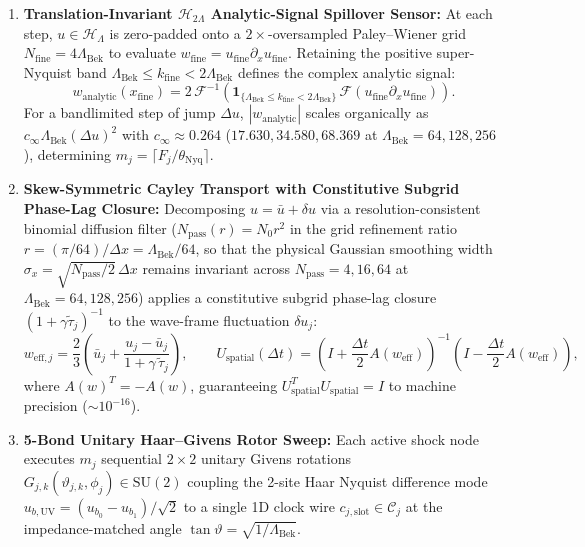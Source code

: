 \documentclass[11pt,a4paper]{article}
\theoremstyle{definition}
\begin{document}
\begin{enumerate}
\item \textbf{Translation-Invariant $\mathcal{H}_{2\Lambda}$ Analytic-Signal Spillover Sensor:} At each step, $u \in \mathcal{H}_{\Lambda}$ is zero-padded onto a $2\times$-oversampled Paley--Wiener grid $N_{\text{fine}} = 4\Lambda_{\text{Bek}}$ to evaluate $w_{\text{fine}} = u_{\text{fine}} \partial_x u_{\text{fine}}$. Retaining the positive super-Nyquist band $\Lambda_{\text{Bek}} \le k_{\text{fine}} < 2\Lambda_{\text{Bek}}$ defines the complex analytic signal:
\begin{equation}
w_{\text{analytic}}(x_{\text{fine}}) = 2 \, \mathcal{F}^{-1}\!\left( \mathbf{1}_{\{\Lambda_{\text{Bek}} \le k_{\text{fine}} < 2\Lambda_{\text{Bek}}\}} \, \mathcal{F}(u_{\text{fine}} \partial_x u_{\text{fine}}) \right).
\end{equation}
For a bandlimited step of jump $\Delta u$, $|w_{\text{analytic}}|$ scales organically as $c_{\infty} \Lambda_{\text{Bek}} (\Delta u)^2$ with $c_{\infty} \approx 0.264$ ($17.630, 34.580, 68.369$ at $\Lambda_{\text{Bek}} = 64, 128, 256$), determining $m_j = \lceil F_j / \theta_{\text{Nyq}} \rceil$.
\item \textbf{Skew-Symmetric Cayley Transport with Constitutive Subgrid Phase-Lag Closure:} Decomposing $u = \bar{u} + \delta u$ via a resolution-consistent binomial diffusion filter ($N_{\text{pass}}(r) = N_0 r^2$ in the grid refinement ratio $r = (\pi / 64)/\Delta x = \Lambda_{\text{Bek}} / 64$, so that the physical Gaussian smoothing width $\sigma_x = \sqrt{N_{\text{pass}}/2}\,\Delta x$ remains invariant across $N_{\text{pass}} = 4, 16, 64$ at $\Lambda_{\text{Bek}} = 64, 128, 256$) applies a constitutive subgrid phase-lag closure $(1 + \gamma \tilde{\tau}_j)^{-1}$ to the wave-frame fluctuation $\delta u_j$:
\begin{equation}
w_{\text{eff}, j} = \frac{2}{3} \left( \bar{u}_j + \frac{u_j - \bar{u}_j}{1 + \gamma \, \tilde{\tau}_j} \right), \qquad U_{\text{spatial}}(\Delta t) = \left(I + \frac{\Delta t}{2} A(w_{\text{eff}})\right)^{-1} \left(I - \frac{\Delta t}{2} A(w_{\text{eff}})\right),
\end{equation}
where $A(w)^T = -A(w)$, guaranteeing $U_{\text{spatial}}^T U_{\text{spatial}} = I$ to machine precision ($\sim 10^{-16}$).
\item \textbf{5-Bond Unitary Haar--Givens Rotor Sweep:} Each active shock node executes $m_j$ sequential $2 \times 2$ unitary Givens rotations $G_{j,k}(\vartheta_{j,k}, \phi_j) \in \mathrm{SU}(2)$ coupling the 2-site Haar Nyquist difference mode $u_{b,\text{UV}} = (u_{b_0} - u_{b_1})/\sqrt{2}$ to a single 1D clock wire $c_{j,\text{slot}} \in \mathcal{C}_j$ at the impedance-matched angle $\tan\vartheta = \sqrt{1/\Lambda_{\text{Bek}}}$.
\end{enumerate}
\end{document}
